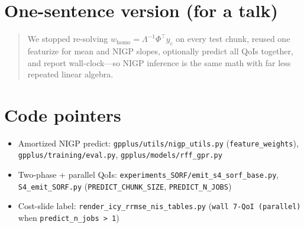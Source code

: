 \documentclass[11pt]{article}
\newcommand{\homo}{w_{\mathrm{homo}}}
\newcommand{\Phitr}{\Phi}
\begin{document}
\section{One-sentence version (for a talk)}

\begin{quote}
We stopped re-solving $\homo=\Lambda^{-1}\Phitr^{\top}y_c$ on every test chunk,
reused one featurize for mean and NIGP slopes, optionally predict all QoIs
together, and report wall-clock---so NIGP inference is the same math with far
less repeated linear algebra.
\end{quote}

\section*{Code pointers}
\begin{itemize}[leftmargin=1.2em,itemsep=0.2em]
  \item Amortized NIGP predict:
        \texttt{gpplus/utils/nigp\_utils.py} (\texttt{feature\_weights}),
        \texttt{gpplus/training/eval.py},
        \texttt{gpplus/models/rff\_gpr.py}
  \item Two-phase + parallel QoIs:
        \texttt{experiments\_SORF/emit\_s4\_sorf\_base.py},
        \texttt{S4\_emit\_SORF.py} (\texttt{PREDICT\_CHUNK\_SIZE}, \texttt{PREDICT\_N\_JOBS})
  \item Cost-slide label:
        \texttt{render\_icy\_rrmse\_nis\_tables.py}
        (\texttt{wall 7-QoI (parallel)} when \texttt{predict\_n\_jobs\,>\,1})
\end{itemize}
\end{document}
